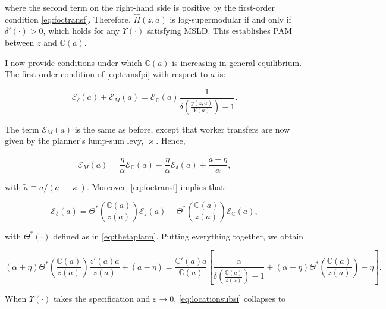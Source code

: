 where the second term on the right-hand side is positive by the first-order condition \eqref{eq:foctransf}. Therefore, $\widehat{\Pi}(z,a)$ is log-supermodular if and only if $\delta'\left(\cdot\right) > 0$, which holds for any $\Upsilon(\cdot)$ satisfying MSLD. This establishes PAM between $z$ and $\mathbb{C}(a)$.

I now provide conditions under which $\mathbb{C}(a)$ is increasing in general equilibrium. The first-order condition of \eqref{eq:transfpi} with respect to $a$ is:

\begin{equation*}
\mathcal{E}_{\delta}(a) + \mathcal{E}_{M}(a) = \mathcal{E}_{\mathbb{C}}(a) \frac{1}{\delta\left(\frac{y(z,a)}{Y(a)}\right) - 1}.
\end{equation*}

The term $\mathcal{E}_{M}(a)$ is the same as before, except that worker transfers are now given by the planner’s lump-sum levy, $\varkappa$. Hence,

\begin{equation*}
\mathcal{E}_{M}(a) = \frac{\eta}{\alpha} \mathcal{E}_{\mathbb{C}}(a) + \frac{\eta}{\alpha} \mathcal{E}_{\delta}(a) + \frac{\widetilde{a}-\eta}{\alpha},
\end{equation*}

with $\widetilde{a} \equiv a/(a-\varkappa)$. Moreover, \eqref{eq:foctransf} implies that:

\begin{equation*}
\mathcal{E}_{\delta}(a) = \Theta^*\left(\frac{\mathbb{C}(a)}{z(a)}\right)\mathcal{E}_{z}(a) - \Theta^*\left(\frac{\mathbb{C}(a)}{z(a)}\right)\mathcal{E}_{\mathbb{C}}(a),
\end{equation*}

with $\Theta^*\left(\cdot\right)$ defined as in \eqref{eq:thetaplann}. Putting everything together, we obtain

\begin{equation}\label{eq:locationsubsi}
(\alpha + \eta)\Theta^*\left(\frac{\mathbb{C}(a)}{z(a)}\right)\frac{z'(a)a}{z(a)} + (\widetilde{a} - \eta) = \frac{\mathbb{C}'(a) a}{\mathbb{C}(a)} \left[ \frac{\alpha}{\delta\left(\frac{\mathbb{C}(a)}{z(a)}\right) - 1} + (\alpha + \eta)\Theta^*\left(\frac{\mathbb{C}(a)}{z(a)}\right) - \eta \right].
\end{equation}

When $\Upsilon(\cdot)$ takes the \textcite{Klenow&Willis16} specification and $\varepsilon \to 0$, \eqref{eq:locationsubsi} collapses to

